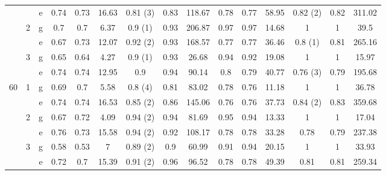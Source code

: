 \documentclass[10pt,a4paper]{elsarticle}
\begin{document}
\begin{table}[h!]
{\begin{tabular}{|c|c|c||ccc|ccc||ccc|ccc|}
&       & e     & 0.74  & 0.73  & 16.63 & \textcolor[rgb]{ 1,  0,  0}{0.81 (3)} & 0.83  & 118.67 & 0.78  & 0.77  & 58.95 & \textcolor[rgb]{ 1,  0,  0}{0.82 (2)} & 0.82  & 311.02 \bigstrut[b]\\
\cline{2-15}          & \multirow{2}[2]{*}{2} & g     & 0.7   & 0.7   & 6.37  & \textcolor[rgb]{ 1,  0,  0}{0.9 (1)} & 0.93  & 206.87 & 0.97  & 0.97  & 14.68 & 1     & 1     & 39.5 \bigstrut[t]\\
&       & e     & 0.67  & 0.73  & 12.07 & \textcolor[rgb]{ 1,  0,  0}{0.92 (2)} & 0.93  & 168.57 & 0.77  & 0.77  & 36.46 & \textcolor[rgb]{ 1,  0,  0}{0.8 (1)} & 0.81  & 265.16 \bigstrut[b]\\
\cline{2-15}          & \multirow{2}[2]{*}{3} & g     & 0.65  & 0.64  & 4.27  & \textcolor[rgb]{ 1,  0,  0}{0.9 (1)} & 0.93  & 26.68 & 0.94  & 0.92  & 19.08 & 1     & 1     & 15.97 \bigstrut[t]\\
&       & e     & 0.74  & 0.74  & 12.95 & 0.9   & 0.94  & 90.14 & 0.8   & 0.79  & 40.77 & \textcolor[rgb]{ 1,  0,  0}{0.76 (3)} & 0.79  & 195.68 \bigstrut[b]\\
\hline
\hline
\multirow{6}[6]{*}{60} & \multirow{2}[2]{*}{1} & g     & 0.69  & 0.7   & 5.58  & \textcolor[rgb]{ 1,  0,  0}{0.8 (4)} & 0.81  & 83.02 & 0.78  & 0.76  & 11.18 & 1     & 1     & 36.78 \bigstrut[t]\\
&       & e     & 0.74  & 0.74  & 16.53 & \textcolor[rgb]{ 1,  0,  0}{0.85 (2)} & 0.86  & 145.06 & 0.76  & 0.76  & 37.73 & \textcolor[rgb]{ 1,  0,  0}{0.84 (2)} & 0.83  & 359.68 \bigstrut[b]\\
\cline{2-15}          & \multirow{2}[2]{*}{2} & g     & 0.67  & 0.72  & 4.09  & \textcolor[rgb]{ 1,  0,  0}{0.94 (2)} & 0.94  & 81.69 & 0.95  & 0.94  & 13.33 & 1     & 1     & 17.04 \bigstrut[t]\\
&       & e     & 0.76  & 0.73  & 15.58 & \textcolor[rgb]{ 1,  0,  0}{0.94 (2)} & 0.92  & 108.17 & 0.78  & 0.78  & 33.28 & 0.78  & 0.79  & 237.38 \bigstrut[b]\\
\cline{2-15}          & \multirow{2}[2]{*}{3} & g     & 0.58  & 0.53  & 7     & \textcolor[rgb]{ 1,  0,  0}{0.89 (2)} & 0.9   & 60.99 & 0.91  & 0.94  & 20.15 & 1     & 1     & 33.93 \bigstrut[t]\\
&       & e     & 0.72  & 0.7   & 15.39 & \textcolor[rgb]{ 1,  0,  0}{0.91 (2)} & 0.96  & 96.52 & 0.78  & 0.78  & 49.39 & 0.81  & 0.81  & 259.34 \bigstrut[b]\\
\hline
\end{tabular}}%
\label{table:tab2}%
\end{table}%
\end{document}
